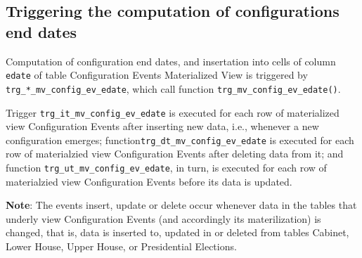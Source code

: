 \subsection{Triggering the computation of configurations end dates}\label{subsec_trg_mv_config_ev_edate}

Computation of configuration end dates, and insertation into cells of column \texttt{edate} of table Configuration Events Materialized View is triggered by  \texttt{trg\_*\_mv\_config\_ev\_edate}, which call function \texttt{trg\_mv\_config\_ev\_edate()}.

Trigger \texttt{trg\_it\_mv\_config\_ev\_edate} is executed for each row of materialized view Configuration Events after inserting new data, i.e., whenever a new configuration emerges; 
function\texttt{trg\_dt\_mv\_config\_ev\_edate} is executed for each row of materialzied view Configuration Events after deleting data from it; and 
function \texttt{trg\_ut\_mv\_config\_ev\_edate}, in turn, is executed for each row of materialzied view Configuration Events before its data is updated.  

{\bf Note}: The events insert, update or delete occur whenever data in the tables that underly view Configuration Events (and accordingly its materilization) is changed, that is, data is inserted to, updated in or deleted from tables Cabinet, Lower House, Upper House, or Presidential Elections. 
